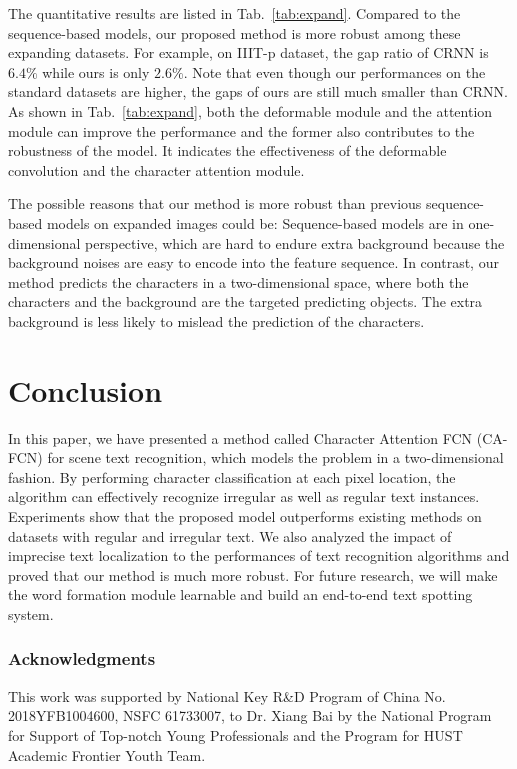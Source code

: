 \documentclass[letterpaper]{article} \usepackage{aaai19}  \usepackage{times}  \usepackage{helvet}  \usepackage{courier}  \usepackage{url}  \usepackage{graphicx}  \frenchspacing  \usepackage{multirow}
\begin{document}
The quantitative results are listed in Tab.~\ref{tab:expand}. Compared to the sequence-based models, our proposed method is more robust among these expanding datasets. For example, on IIIT-p dataset, the gap ratio of CRNN is $6.4\%$ while ours is only $2.6\%$. Note that even though our performances on the standard datasets are higher, the gaps of ours are still much smaller than CRNN. 
As shown in Tab.~\ref{tab:expand}, both the deformable module and the attention module can improve the performance and the former also contributes to the robustness of the model. It indicates the effectiveness of the deformable convolution and the character attention module.

The possible reasons that our method is more robust than previous sequence-based models on expanded images could be:
Sequence-based models are in one-dimensional perspective, which are hard to endure extra background because the background noises are easy to encode into the feature sequence. In contrast, our method predicts the characters in a two-dimensional space, where both the characters and the background are the targeted predicting objects. The extra background is less likely to mislead the prediction of the characters. 

\section{Conclusion}

In this paper, we have presented a method called Character Attention FCN (CA-FCN) for scene text recognition, which models the problem in a two-dimensional fashion. By performing character classification at each pixel location, the algorithm can effectively recognize irregular as well as regular text instances. Experiments show that the proposed model outperforms existing methods on datasets with regular and irregular text. We also analyzed the impact of imprecise text localization to the performances of text recognition algorithms and proved that our method is much more robust. For future research, we will make the word formation module learnable and build an end-to-end text spotting system.

\subsubsection*{Acknowledgments}
This work was supported by National Key R\&D Program of China No. 2018YFB1004600, NSFC 61733007, to Dr. Xiang Bai by the National Program for Support of Top-notch Young Professionals and the Program for HUST Academic Frontier Youth Team.



\end{document}
